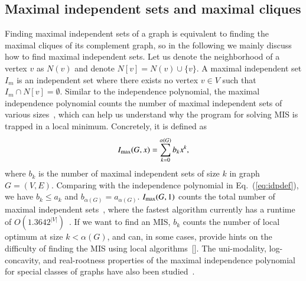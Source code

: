 \documentclass[onefignum, onetabnum]{siamart190516}
\newcommand{\<}{\langle}
\renewcommand{\>}{\rangle}
\newcommand{\Eq}[1]{Eq.~(\ref{#1})}
\newcommand{\red}[1]{[{\bf  \color{red}{ST: #1}}]}
\begin{document}
\subsection{Maximal independent sets and maximal cliques}\label{sec:maximal}
Finding maximal independent sets of a graph is equivalent to finding the maximal cliques of its complement graph, so in the following we mainly discuss how to find maximal independent sets.
Let us denote the neighborhood of a vertex $v$ as $N(v)$ and denote $N[v] = N(v)\cup \{v\}$.
A maximal independent set $I_m$ is an independent set where there exists no vertex $v \in V$ such that $I_m \cap N[v]  = \emptyset$.
Similar to the independence polynomial, the maximal independence polynomial counts the number of maximal independent sets of various sizes~\cite{Hu2017},
which can help us understand why the program for solving MIS is trapped in a local minimum.
Concretely, it is defined as
\begin{equation}
I_{\rm max}(G, x) = \sum_{k=0}^{\alpha(G)} b_k x^k,
\end{equation}
where $b_k$ is the number of maximal independent sets of size $k$ in graph $G=(V, E)$.
Comparing with the independence polynomial in \Eq{eq:idpdef}, we have $b_{k} \leq a_{k}$ and $b_{\alpha(G)} = a_{\alpha(G)}$. $I_{\rm max}(G, 1)$ counts the total number of maximal independent sets~\cite{Gaspers2012, Manne2013}, where the fastest algorithm currently has a runtime of $O(1.3642^{|V|})$~\cite{Gaspers2012}.
If we want to find an MIS, $b_{k}$ counts the number of local optimum at size $k < \alpha(G)$, and can, in some cases, provide hints on the difficulty of finding the MIS using local algorithms~\red{cite experiment}.
The uni-modality, log-concavity, and real-rootness properties of the maximal independence polynomial for special classes of graphs have also been studied~\cite{Hu2017}. 
\end{document}
